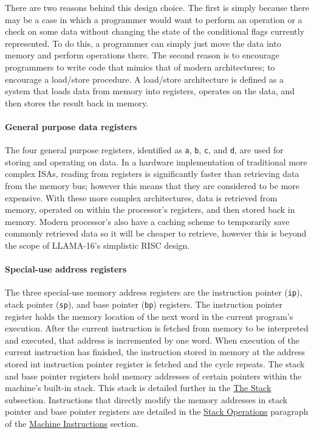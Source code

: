 \documentclass[man,hidelinks,floatsintext]{apa7}
\begin{document}
There are two reasons behind this design choice. The first is simply because there may be a case in which a programmer would want to perform an operation or a check on some data without changing the state of the conditional flags currently represented. To do this, a programmer can simply just move the data into memory and perform operations there. The second reason is to encourage programmers to write code that mimics that of modern architectures; to encourage a load/store procedure. A load/store architecture is defined as a system that loads data from memory into registers, operates on the data, and then stores the result back in memory.
\paragraph{General purpose data registers}
The four general purpose registers, identified as \verb|a|, \verb|b|, \verb|c|, and \verb|d|, are used for storing and operating on data. In a hardware implementation of traditional more complex ISAs, reading from registers is significantly faster than retrieving data from the memory bus; however this means that they are considered to be more expensive. With these more complex architectures, data is retrieved from memory, operated on within the processor's registers, and then stored back in memory. Modern processor's also have a caching scheme to temporarily save commonly retrieved data so it will be cheaper to retrieve, however this is beyond the scope of LLAMA-16's simplistic RISC design.
\paragraph{Special-use address registers}
The three special-use memory address registers are the instruction pointer (\verb|ip|), stack pointer (\verb|sp|), and base pointer (\verb|bp|) registers. The instruction pointer register holds the memory location of the next word in the current program's execution. After the current instruction is fetched from memory to be interpreted and executed, that address is incremented by one word. When execution of the current instruction has finished, the instruction stored in memory at the address stored int instruction pointer register is fetched and the cycle repeats. The stack and base pointer registers hold memory addresses of certain pointers within the machine's built-in stack. This stack is detailed further in the \hyperref[sec:stack]{The Stack} subsection. Instructions that directly modify the memory addresses in stack pointer and base pointer registers are detailed in the \hyperref[sec:stackops]{Stack Operations} paragraph of the \hyperref[sec:machineinstr]{Machine Instructions} section.
\end{document}

